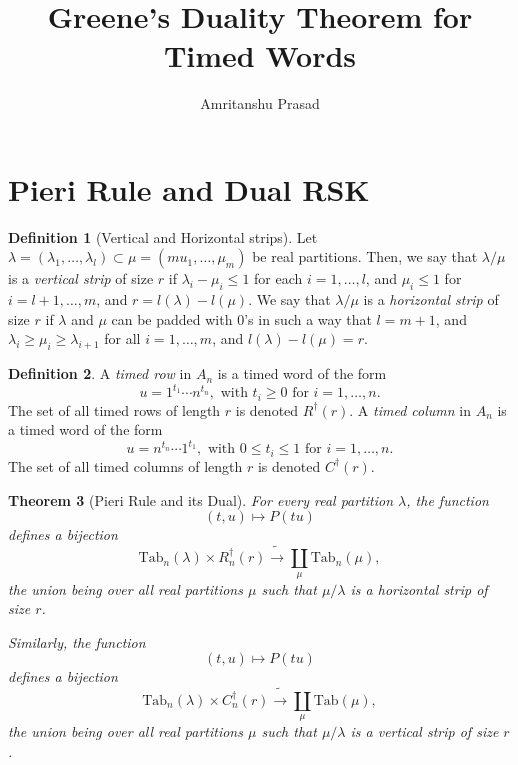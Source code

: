 \documentclass[12pt]{amsart}
\title{Greene's Duality Theorem for Timed Words}
\author{Amritanshu Prasad}
\newcommand{\ttab}{\mathrm{Tab}}
\newtheorem{theorem}{Theorem}
\theoremstyle{definition}
\newtheorem{definition}[theorem]{Definition}
\begin{document}
\maketitle
\section{Pieri Rule and Dual RSK}
\begin{definition}[Vertical and Horizontal strips]
  Let $\lambda = (\lambda_1,\dotsc,\lambda_l) \subset \mu=(mu_1,\dotsc,\mu_m)$ be real partitions.
  Then, we say that $\lambda/\mu$ is a \emph{vertical strip} of size $r$ if $\lambda_i-\mu_i\leq 1$ for each $i=1,\dotsc, l$, and $\mu_i\leq 1$ for $i=l+1,\dotsc,m$, and $r=l(\lambda)-l(\mu)$.
  We say that $\lambda/\mu$ is a \emph{horizontal strip} of size $r$ if $\lambda$ and $\mu$ can be padded with $0$'s in such a way that $l=m+1$, and $\lambda_i\geq \mu_i\geq \lambda_{i+1}$ for all $i=1,\dotsc,m$, and $l(\lambda)-l(\mu)=r$.
\end{definition}
\begin{definition}
  A \emph{timed row} in $A_n$ is a timed word of the form
  \begin{displaymath}
    u = 1^{t_1} \dotsb n ^{t_n}, \text{ with } t_i\geq 0 \text{ for } i=1,\dotsc,n.
  \end{displaymath}
  The set of all timed rows of length $r$ is denoted $R^\dagger(r)$.
  A \emph{timed column} in $A_n$ is a timed word of the form
  \begin{displaymath}
    u = n^{t_n} \dotsb 1^{t_1}, \text{ with } 0\leq t_i\leq 1 \text{ for } i=1,\dotsc, n.
  \end{displaymath}
  The set of all timed columns of length $r$ is denoted $C^\dagger(r)$.
\end{definition}
\begin{theorem}[Pieri Rule and its Dual]
  For every real partition $\lambda$, the function
  \begin{displaymath}
    (t,u) \mapsto P(tu)
  \end{displaymath}
  defines a bijection
  \begin{displaymath}
    \ttab_n(\lambda) \times R_n^\dagger(r)\tilde\to\coprod_\mu \ttab_n(\mu),
  \end{displaymath}
  the union being over all real partitions $\mu$ such that $\mu/\lambda$ is a horizontal strip of size $r$.

  Similarly, the function
  \begin{displaymath}
    (t,u) \mapsto P(tu)
  \end{displaymath}
  defines a bijection
  \begin{displaymath}
    \ttab_n(\lambda)\times C_n^\dagger(r)\tilde\to\coprod_\mu \ttab(\mu),
  \end{displaymath}
  the union being over all real partitions $\mu$ such that $\mu/\lambda$ is a vertical strip of size $r$.
\end{theorem}
\end{document}
